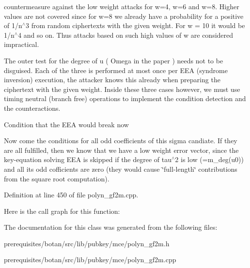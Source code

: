 countermeasure against the low weight attacks for w=4, w=6 and w=8. Higher values are not covered since for w=8 we already have a probability for a positive of 1/n$^\wedge$3 from random ciphertexts with the given weight. For w = 10 it would be 1/n$^\wedge$4 and so on. Thus attacks based on such high values of w are considered impractical.

The outer test for the degree of u ( Omega in the paper ) needs not to be disguised. Each of the three is performed at most once per E\+EA (syndrome inversion) execution, the attacker knows this already when preparing the ciphertext with the given weight. Inside these three cases however, we must use timing neutral (branch free) operations to implement the condition detection and the counteractions.

Condition that the E\+EA would break now

Now come the conditions for all odd coefficients of this sigma candiate. If they are all fulfilled, then we know that we have a low weight error vector, since the key-\/equation solving E\+EA is skipped if the degree of tau$^\wedge$2 is low (=m\+\_\+deg(u0)) and all its odd cofficients are zero (they would cause \char`\"{}full-\/length\char`\"{} contributions from the square root computation).

Definition at line 450 of file polyn\+\_\+gf2m.\+cpp.

Here is the call graph for this function\+:


The documentation for this class was generated from the following files\+:\begin{DoxyCompactItemize}
\item 
prerequisites/botan/src/lib/pubkey/mce/polyn\+\_\+gf2m.\+h\item 
prerequisites/botan/src/lib/pubkey/mce/polyn\+\_\+gf2m.\+cpp\end{DoxyCompactItemize}
